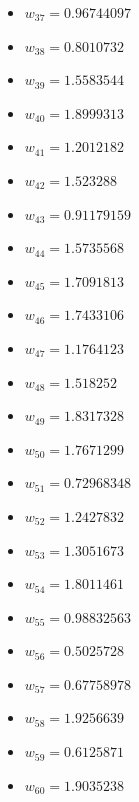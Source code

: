\documentclass[11pt]{article}
\begin{document}
\begin{itemize}
\item $w_{37} = 0.96744097$
\item $w_{38} = 0.8010732$
\item $w_{39} = 1.5583544$
\item $w_{40} = 1.8999313$
\item $w_{41} = 1.2012182$
\item $w_{42} = 1.523288$
\item $w_{43} = 0.91179159$
\item $w_{44} = 1.5735568$
\item $w_{45} = 1.7091813$
\item $w_{46} = 1.7433106$
\item $w_{47} = 1.1764123$
\item $w_{48} = 1.518252$
\item $w_{49} = 1.8317328$
\item $w_{50} = 1.7671299$
\item $w_{51} = 0.72968348$
\item $w_{52} = 1.2427832$
\item $w_{53} = 1.3051673$
\item $w_{54} = 1.8011461$
\item $w_{55} = 0.98832563$
\item $w_{56} = 0.5025728$
\item $w_{57} = 0.67758978$
\item $w_{58} = 1.9256639$
\item $w_{59} = 0.6125871$
\item $w_{60} = 1.9035238$
\end{itemize}
\end{document}

